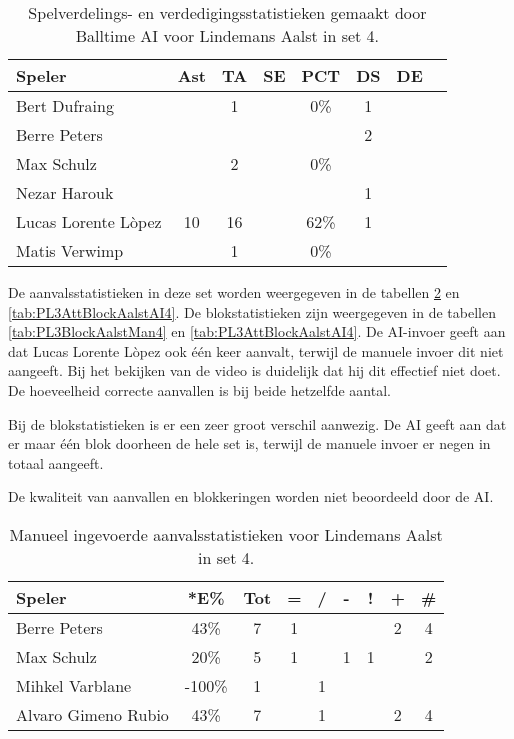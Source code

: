 \begin{table}[ht!]
  \centering
  \scriptsize
  \begin{tabular}{|l|c|c|c|c|c|c|c|} \hline
    \textbf{Speler} & Ast & TA & SE & PCT & DS &  DE \\ \hline
    Bert Dufraing &  & 1 &  & 0\% & 1 &  \\
    Berre Peters &   &   &   &   & 2 &   \\
    Max Schulz &  & 2 &  & 0\% &   &   \\
    Nezar Harouk &   &   &   &   &  1 &   \\
    Lucas Lorente Lòpez & 10 & 16 &  & 62\% & 1 &  \\
    Matis Verwimp &  & 1 & & 0\% &   &   \\ \hline
  \end{tabular}
 \caption[Spelverdelings- en verdedigingsstatistieken gemaakt door Balltime AI voor Lindemans Aalst in set 4]{\label{tab:PL3SetDigAalstAI4}Spelverdelings- en verdedigingsstatistieken gemaakt door Balltime AI voor Lindemans Aalst in set 4.}
\end{table}

De aanvalsstatistieken in deze set worden weergegeven in de tabellen \ref{tab:PL3AttAalstMan4} en \ref{tab:PL3AttBlockAalstAI4}. De blokstatistieken zijn weergegeven in de tabellen \ref{tab:PL3BlockAalstMan4} en \ref{tab:PL3AttBlockAalstAI4}. De AI-invoer geeft aan dat Lucas Lorente Lòpez ook één keer aanvalt, terwijl de manuele invoer dit niet aangeeft. Bij het bekijken van de video is duidelijk dat hij dit effectief niet doet. De hoeveelheid correcte aanvallen is bij beide hetzelfde aantal.

Bij de blokstatistieken is er een zeer groot verschil aanwezig. De AI geeft aan dat er maar één blok doorheen de hele set is, terwijl de manuele invoer er negen in totaal aangeeft.

De kwaliteit van aanvallen en blokkeringen worden niet beoordeeld door de AI. 

\begin{table}[ht!]
    \centering
    \scriptsize
    \begin{tabular}{|l|c|c|c|c|c|c|c|c|}
        \hline
        \textbf{Speler} & *E\% & Tot & = & / & - & ! & + & \# \\ \hline
        Berre Peters & 43\% & 7 & 1 &  &  & & 2 & 4 \\ 
        Max Schulz & 20\% & 5 & 1 &  & 1 & 1 & & 2 \\ 
        Mihkel Varblane & -100\% & 1 &  & 1 &  &  &  & \\ 
        Alvaro Gimeno Rubio & 43\% & 7 &  & 1 & & & 2 & 4 \\ \hline
    \end{tabular}
    \caption[Manueel ingevoerde aanvalsstatistieken voor Lindemans Aalst in set 4]{\label{tab:PL3AttAalstMan4}Manueel ingevoerde aanvalsstatistieken voor Lindemans Aalst in set 4.}
\end{table}

